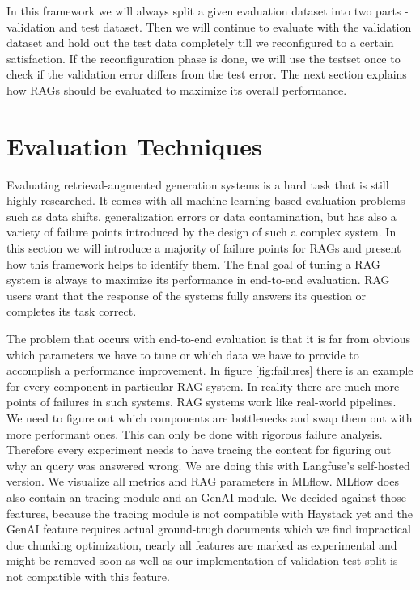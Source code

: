 In this framework we will always split a given evaluation dataset into two parts - validation and test dataset. Then we will continue to evaluate with the validation dataset and hold out the test data completely till we reconfigured to a certain satisfaction. If the reconfiguration phase is done, we will use the testset once to check if the validation error differs from the test error. The next section explains how RAGs should be evaluated to maximize its overall performance.


\section{Evaluation Techniques}

Evaluating retrieval-augmented generation systems is a hard task that is still highly researched. It comes with all machine learning based evaluation problems such as data shifts, generalization errors or data contamination, but has also a variety of failure points introduced by the design of such a complex system. In this section we will introduce a majority of failure points for RAGs and present how this framework helps to identify them. The final goal of tuning a RAG system is always to maximize its performance in end-to-end evaluation. RAG users want that the response of the systems fully answers its question or completes its task correct. 

The problem that occurs with end-to-end evaluation is that it is far from obvious which parameters we have to tune or which data we have to provide to accomplish a performance improvement. In figure \ref{fig:failures} there is an example for every component in particular RAG system. In reality there are much more points of failures in such systems. RAG systems work like real-world pipelines. We need to figure out which components are bottlenecks and swap them out with more performant ones. This can only be done with rigorous failure analysis. Therefore every experiment needs to have tracing the content for figuring out why an query was answered wrong. We are doing this with Langfuse's\cite{Langfuse} self-hosted version. We visualize all metrics and RAG parameters in MLflow\cite{MLflow}. MLflow does also contain an tracing module and an GenAI module. We decided against those features, because the tracing module is not compatible with Haystack yet and the GenAI feature requires actual ground-trugh documents which we find impractical due chunking optimization, nearly all features are marked as experimental and might be removed soon as well as our implementation of validation-test split is not compatible with this feature.

